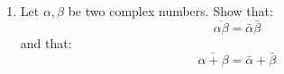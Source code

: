 \begin{enumerate}
	\textbf{Proof:} \\
	Note 
	\begin{align*}
	\alpha = x + yi \;\; & \Leftrightarrow \;\; \bar{\alpha} = x - yi. \\ 
	\therefore \; \bar{\bar{\alpha}} &= \overline{x - yi}\\
	\end{align*}
	\\
	So now because the conjugate operation just changes the sign on the \textit{imaginary} part of $\alpha$ we have the straightforward result of:
	\begin{align*}
	\bar{\bar{\alpha}} &= \overline{x - yi} \\ 
	&= x + yi \\
	\therefore \; \bar{\bar{\alpha}} &= \alpha
	\end{align*}
	\qed

	
	\item Let $\alpha, \beta$ be two complex numbers. Show that: 
	$$\overline{\alpha \beta} = \bar{\alpha}\bar{\beta}$$ 
	and that:
	$$ \overline{\alpha + \beta} = \bar{\alpha} + \bar{\beta}$$
	

\end{enumerate}
